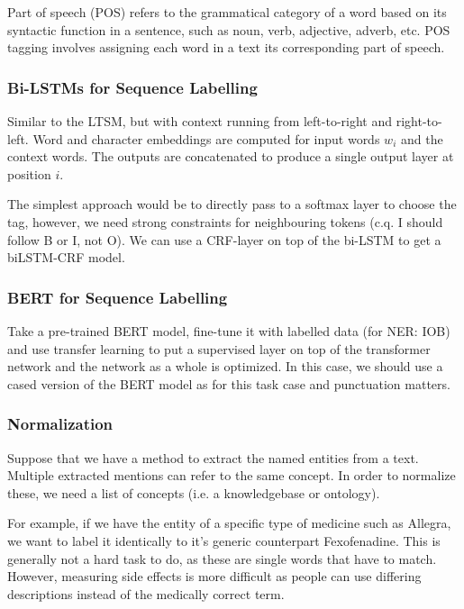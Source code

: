 \begin{definition}
  Part of speech (POS) refers to the grammatical category of a word
  based on its syntactic function in a sentence, such as noun, verb,
  adjective, adverb, etc. POS tagging involves assigning each word in
  a text its corresponding part of speech.
\end{definition}

\subsubsection{Bi-LSTMs for Sequence Labelling}

Similar to the LTSM, but with context running from left-to-right and
right-to-left. Word and character embeddings are computed for input words $w_i$
and the context words. The outputs are concatenated to produce a
single output layer
at position $i$.

The simplest approach would be to directly pass to a softmax layer to
choose the tag,
however, we need strong constraints for neighbouring tokens (c.q. I
should follow B or I, not O).
We can use a CRF-layer on top of the bi-LSTM to get a biLSTM-CRF model.

\subsubsection{BERT for Sequence Labelling}

Take a pre-trained BERT model, fine-tune it with labelled data (for NER: IOB)
and use transfer learning to put a supervised layer on top of the transformer
network and the network as a whole is optimized. In this case, we should use a
cased version of the BERT model as for this task case and punctuation matters.

\subsubsection{Normalization}

Suppose that we have a method to extract the named entities from a
text. Multiple
extracted mentions can refer to the same concept. In order to
normalize these, we
need a list of concepts (i.e. a knowledgebase or ontology).

For example, if we have the entity of a specific type of medicine
such as Allegra, we want to label it identically to it's generic counterpart
Fexofenadine. This is generally not a hard task to do, as these are single words
that have to match. However, measuring side effects is more difficult as people
can use differing descriptions instead of the medically correct term.

